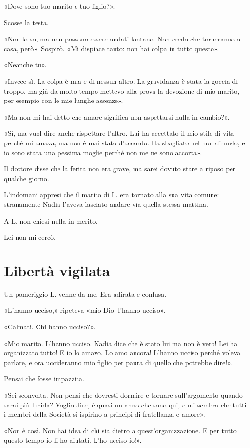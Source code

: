 \documentclass[a4paper,10pt]{memoir}
\begin{document}
«Dove sono tuo marito e tuo figlio?».

Scosse la testa.

«Non lo so, ma non possono essere andati lontano. Non credo che torneranno a casa, però». Sospirò. «Mi dispiace tanto:
non hai colpa in tutto questo».

«Neanche tu».

«Invece sì. La colpa è mia e di nessun altro. La gravidanza è stata la goccia di troppo, ma già da molto tempo mettevo
alla prova la devozione di mio marito, per esempio con le mie lunghe assenze».

«Ma non mi hai detto che amare significa non aspettarsi nulla in cambio?».

«Sì, ma vuol dire anche rispettare l'altro. Lui ha accettato il mio stile di vita perché mi amava, ma non è mai stato
d'accordo. Ha sbagliato nel non dirmelo, e io sono stata una pessima moglie perché non me ne sono accorta».

Il dottore disse che la ferita non era grave, ma sarei dovuto stare a riposo per qualche giorno.

L'indomani appresi che il marito di L. era tornato alla sua vita comune: stranamente Nadia l'aveva lasciato andare via
quella stessa mattina.

A L. non chiesi nulla in merito.

Lei non mi cercò.

\chapter{Libertà vigilata}

Un pomeriggio L. venne da me. Era adirata e confusa.

«L'hanno ucciso,» ripeteva «mio Dio, l'hanno ucciso».

«Calmati. Chi hanno ucciso?».

«Mio marito. L'hanno ucciso. Nadia dice che è stato lui ma non è vero! Lei ha organizzato tutto! E io lo amavo. Lo amo
ancora! L'hanno ucciso perché voleva parlare, e ora uccideranno mio figlio per paura di quello che potrebbe dire!».

Pensai che fosse impazzita.

«Sei sconvolta. Non pensi che dovresti dormire e tornare sull'argomento quando sarai più lucida? Voglio dire, è quasi un
anno che sono qui, e mi sembra che tutti i membri della Società si ispirino a principi di fratellanza e amore».

«Non è così. Non hai idea di chi sia dietro a quest'organizzazione. E per tutto questo tempo io li ho aiutati. L'ho
ucciso io!».
\end{document}
